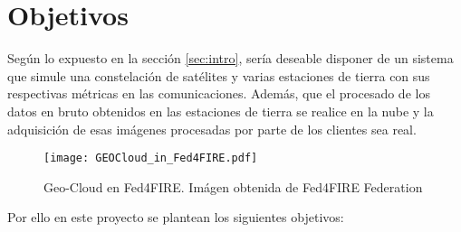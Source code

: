 
\section{Objetivos}
\label{sec:objetivos}

Según lo expuesto en la sección \ref{sec:intro}, sería deseable disponer de
un sistema que simule una constelación de satélites y varias estaciones de tierra con sus respectivas métricas en las comunicaciones. Además, que el procesado de los datos en bruto obtenidos en las estaciones de tierra se realice en la nube y la adquisición de esas imágenes procesadas por parte de los clientes sea real.

\begin{figure}
\begin{center}
\texttt{[image: GEOCloud\_in\_Fed4FIRE.pdf]}
\caption{Geo-Cloud en Fed4FIRE. Imágen obtenida de Fed4FIRE Federation\cite{F4F}}
\end{center}
\end{figure}

Por ello en este proyecto se plantean los siguientes objetivos:

